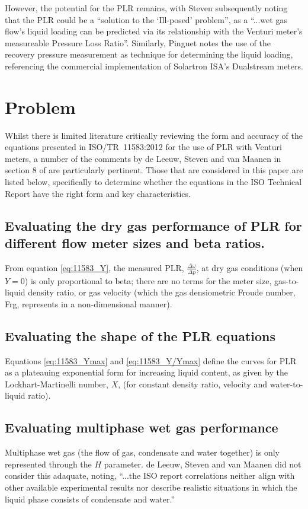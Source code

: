 \documentclass[journal]{IEEEtran}
\begin{document}
However, the potential for the \acrlong{PLR} remains, with Steven \cite{Steven2018OrificeProblem} subsequently noting that the \acrshort{PLR} could be a ``solution to the `Ill-posed' problem'', as a ``...wet gas flow’s liquid loading can be predicted via its relationship with the Venturi meter’s measureable Pressure Loss Ratio''.  Similarly, Pinguet \cite{Pinguet2018ExtensiveConditions} notes the use of the recovery pressure measurement as technique for determining the liquid loading, referencing the commercial implementation of Solartron ISA's Dualstream meters.

\section{Problem}

Whilst there is limited literature critically reviewing the form and accuracy of the equations presented in ISO/TR~11583:2012 for the use of \acrlong{PLR} with Venturi meters, a number of the comments by de Leeuw, Steven and van Maanen in section 8 of \cite{DeLeeuw2011} are particularly pertinent.  Those that are considered in this paper are listed below, specifically to determine whether the equations in the ISO Technical Report have the right form and key characteristics.

\subsection{Evaluating the dry gas performance of \acrshort{PLR} for different flow meter sizes and beta ratios.}
From equation \ref{eq:11583_Y}, the measured \acrshort{PLR}, $\frac{\Delta \omega}{\Delta p}$, at dry gas conditions (when $Y=0$) is only proportional to beta; there are no terms for the meter size, gas-to-liquid density ratio, or gas velocity (which the gas densiometric Froude number, \acrshort{Frg}, represents in a non-dimensional manner).

\subsection{Evaluating the shape of the PLR equations}
Equations \ref{eq:11583_Ymax} and \ref{eq:11583_Y/Ymax} define the curves for \acrshort{PLR} as a plateauing exponential form for increasing liquid content, as given by the Lockhart-Martinelli number, $X$, (for constant density ratio, velocity and water-to-liquid ratio).

\subsection{Evaluating multiphase wet gas performance}
Multiphase wet gas (the flow of gas, condensate and water together) is only represented through the $H$ parameter.  de Leeuw, Steven and van Maanen did not consider this adaquate, noting, ``...the ISO report correlations neither align with other available experimental results nor describe realistic situations in which the liquid phase consists of condensate and water.''
\end{document}
